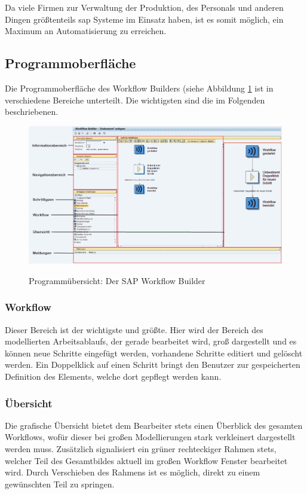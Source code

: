 Da viele Firmen zur Verwaltung der Produktion, des Personals und anderen Dingen größtenteils \gls{sap} Systeme im Einsatz haben, ist es somit möglich, ein Maximum an Automatisierung zu erreichen.

\subsection{Programmoberfläche}
\label{sec:win-overwiev}
Die Programmoberfläche des Workflow Builders (siehe Abbildung \ref{abb:workflow-overview} ist in verschiedene Bereiche unterteilt. Die wichtigsten sind die im Folgenden beschriebenen.

\begin{figure}[h]
	\begin{center}
	\includegraphics[width=1.0\textwidth]{grafiken/wf-builder_overview.png}
	\caption{Programmübersicht: Der SAP Workflow Builder}
	\vspace{-10pt}
	\label{abb:workflow-overview}
	\end{center}
\end{figure}

\subsubsection{Workflow}
\label{sec:win-overview-wf}
Dieser Bereich ist der wichtigste und größte. Hier wird der Bereich des modellierten Arbeitsablaufs, der gerade bearbeitet wird, groß dargestellt und es können neue Schritte eingefügt werden, vorhandene Schritte editiert und gelöscht werden. Ein Doppelklick auf einen Schritt bringt den Benutzer zur gespeicherten Definition des Elements, welche dort gepflegt werden kann.

\subsubsection{Übersicht}
\label{sec:win-overview-uebersicht}
Die grafische Übersicht bietet dem Bearbeiter stets einen Überblick des gesamten Workflows, wofür dieser bei großen Modellierungen stark verkleinert dargestellt werden muss. Zusätzlich signalisiert ein grüner rechteckiger Rahmen stets, welcher Teil des Gesamtbildes aktuell im großen Workflow Fenster bearbeitet wird. Durch Verschieben des Rahmens ist es möglich, direkt zu einem gewünschten Teil zu springen.

